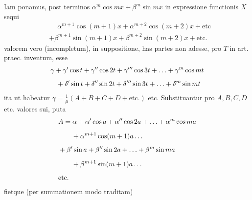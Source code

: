 Iam ponamus, post terminos \(\alpha^m\cos mx+\beta^m\sin mx\) in expressione functionis \(X\) sequi
\[
\begin{aligned}
&\phantom{{}+{}}\alpha^{m+1}\cos(m+1)x+\alpha^{m+2}\cos(m+2)x+\mathrm{etc}\\[5pt]
&+\beta^{m+1}\sin(m+1)x+\beta^{m+2}\sin(m+2)x+\mathrm{etc.}
\end{aligned}
\]
valorem vero (incompletum), in suppositione, has partes non adesse, pro \(T\) in
art. praec. inventum, esse
\[
\begin{aligned}
&\gamma+\gamma'\cos t+\gamma''\cos2t+\gamma'''\cos3t+\mathinner{.\,.\,.}+\gamma^m\cos mt\\[5pt]
&\phantom{\gamma}\;+\delta'\sin t+\delta''\sin2t+\delta'''\sin3t+\mathinner{.\,.\,.}+\delta^m\sin mt
\end{aligned}
\]
ita ut habeatur \(\gamma=\frac{1}{\mu}(A+B+C+D+\mathrm{etc.})\) etc. Substituantur pro \(A,B,C,D\)
etc. valores sui, puta
\[
\begin{aligned}
&A=\alpha+\alpha'\cos a+\alpha''\cos2a+\mathinner{.\,.\,.}+\alpha^m\cos ma\\[5pt]&\qquad{}+\alpha^{m+1}\cos(m+1)a\mathinner{.\,.\,.}\\[5pt]
&+\beta'\sin a+\beta''\sin2a+\mathinner{.\,.\,.}+\beta^m\sin ma\\[5pt]&\qquad{}+\beta^{m+1}\sin(m+1)a\mathinner{.\,.\,.}\\[5pt]
&\mathrm{etc.}
\end{aligned}
\]
fietque (per summationem modo traditam)
